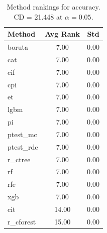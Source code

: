 \begin{table}[h]
\centering
\caption{Method rankings for accuracy. CD = 21.448 at $\alpha=0.05$.}
\label{tab:ranks_accuracy}
\begin{tabular}{lcc}
\toprule
Method & Avg Rank & Std \\
\midrule
boruta & 7.00 & 0.00 \\
cat & 7.00 & 0.00 \\
cif & 7.00 & 0.00 \\
cpi & 7.00 & 0.00 \\
et & 7.00 & 0.00 \\
lgbm & 7.00 & 0.00 \\
pi & 7.00 & 0.00 \\
ptest_mc & 7.00 & 0.00 \\
ptest_rdc & 7.00 & 0.00 \\
r_ctree & 7.00 & 0.00 \\
rf & 7.00 & 0.00 \\
rfe & 7.00 & 0.00 \\
xgb & 7.00 & 0.00 \\
cit & 14.00 & 0.00 \\
r_cforest & 15.00 & 0.00 \\
\bottomrule
\end{tabular}
\end{table}